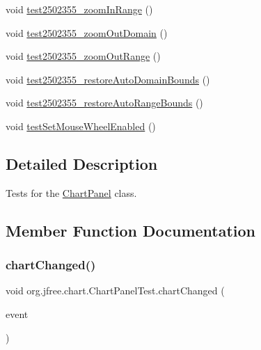 \begin{DoxyCompactItemize}
void \mbox{\hyperlink{classorg_1_1jfree_1_1chart_1_1_chart_panel_test_afec8ff4ec15a426e0f5e13af13d696c3}{test2502355\+\_\+zoom\+In\+Range}} ()
\item 
void \mbox{\hyperlink{classorg_1_1jfree_1_1chart_1_1_chart_panel_test_ad7829bcfaf0b4824d649e9e4a0e29578}{test2502355\+\_\+zoom\+Out\+Domain}} ()
\item 
void \mbox{\hyperlink{classorg_1_1jfree_1_1chart_1_1_chart_panel_test_a0901656f68fad12102248fd141311367}{test2502355\+\_\+zoom\+Out\+Range}} ()
\item 
void \mbox{\hyperlink{classorg_1_1jfree_1_1chart_1_1_chart_panel_test_ab092893ad985ac15bb2177b61d55b3ac}{test2502355\+\_\+restore\+Auto\+Domain\+Bounds}} ()
\item 
void \mbox{\hyperlink{classorg_1_1jfree_1_1chart_1_1_chart_panel_test_afe5f2cff5830fd8b481fe7543fd0f072}{test2502355\+\_\+restore\+Auto\+Range\+Bounds}} ()
\item 
void \mbox{\hyperlink{classorg_1_1jfree_1_1chart_1_1_chart_panel_test_a24c28f5b7be79878a356764f21e6063f}{test\+Set\+Mouse\+Wheel\+Enabled}} ()
\end{DoxyCompactItemize}


\subsection{Detailed Description}
Tests for the \mbox{\hyperlink{classorg_1_1jfree_1_1chart_1_1_chart_panel}{Chart\+Panel}} class. 

\subsection{Member Function Documentation}
\mbox{\label{classorg_1_1jfree_1_1chart_1_1_chart_panel_test_a2adbf5693b2052053d2737583c146f4d}} 
\subsubsection{\texorpdfstring{chart\+Changed()}{chartChanged()}}
{\footnotesize\ttfamily void org.\+jfree.\+chart.\+Chart\+Panel\+Test.\+chart\+Changed (\begin{DoxyParamCaption}\item[{\mbox{\hyperlink{classorg_1_1jfree_1_1chart_1_1event_1_1_chart_change_event}{Chart\+Change\+Event}}}]{event }\end{DoxyParamCaption})}

